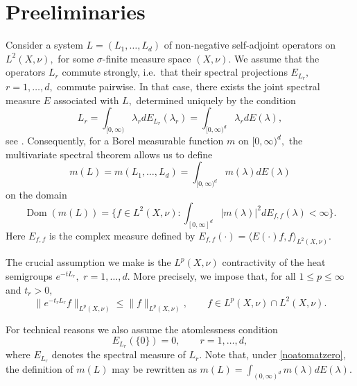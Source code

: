 \documentclass[leqno,12pt]{amsart}
\theoremstyle{definition}
\theoremstyle{remark}
\begin{document}
\section{Preeliminaries}
\label{sec:set}
 Consider a system $L=(L_1,\ldots,L_d)$ of non-negative self-adjoint operators on $L^2(X,\nu),$ for some $\sigma$-finite measure space $(X,\nu).$ We assume that the operators $L_r$ commute strongly, i.e.\ that their spectral projections $E_{L_r},$ $r=1,\ldots,d,$ commute pairwise. In that case, there exists the joint spectral measure $E$ associated with $L,$ determined uniquely by the condition
        \begin{equation*}
        L_r=\int_{[0,\infty)}{\lambda}_r dE_{L_r}({\lambda}_r)=\int_{[0,\infty)^d} {\lambda}_r dE({\lambda}),
        \end{equation*}
        see \cite[Theorem 4.10 and Theorems 5.21, 5.23]{schmu:dgen}.
        Consequently, for a Borel measurable function $m$ on $[0,\infty)^d,$ the multivariate spectral theorem allows us to define
         \begin{equation}
         \label{m(L)def}
        m(L)=m(L_1,\ldots,L_d)=\int_{[0,\infty)^d} m({\lambda}) dE({\lambda})
        \end{equation}
        on the domain
         \begin{equation}\label{m(L)dom} \operatorname{Dom}(m(L))=\bigg\{f\in L^2(X,\nu)\colon \int_{[0,\infty]^d}|m({\lambda})|^2dE_{f,f}({\lambda})<\infty\bigg\}.\end{equation}
         Here $E_{f,f}$ is the complex measure defined by $E_{f,f}(\cdot)=\langle E(\cdot)f,f\rangle_{L^2(X,\nu)}.$

        The crucial assumption we make is the $L^p(X,\nu)$ contractivity of the heat semigroups $e^{-tL_r},$ $r=1,\ldots,d.$ More precisely, we impose that, for all $1\leq p\leq \infty$ and $t_r>0,$
\begin{equation*}
\tag{CTR}
\label{contra}
\|e^{-t_rL_r}f\|_{L^p(X,\nu)}\leq \|f\|_{L^p(X,\nu)},\qquad f\in L^p(X,\nu)\cap L^2(X,\nu).
\end{equation*}

 For technical reasons we also assume the atomlessness condition
\begin{equation*}\tag{ATL} \label{noatomatzero}E_{L_r}(\{0\})=0,\qquad r=1,\ldots,d,\end{equation*} where  $E_{L_r}$ denotes the spectral measure of $L_r.$ Note that, under \eqref{noatomatzero}, the definition of $m(L)$ may be rewritten as $m(L)=\int_{(0,\infty)^d}m({\lambda})dE({\lambda}).$
\end{document}
